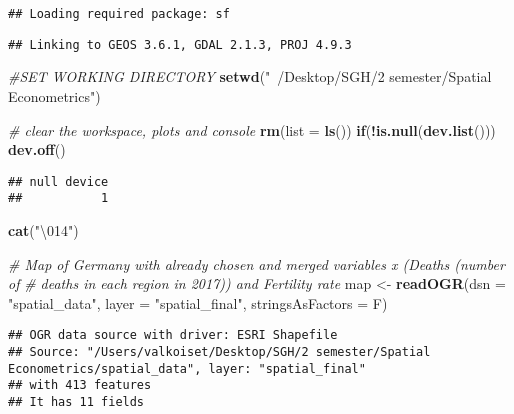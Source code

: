 \documentclass[]{article}
\newenvironment{Shaded}{\begin{snugshade}}{\end{snugshade}}
\newcommand{\KeywordTok}[1]{\textcolor[rgb]{0.13,0.29,0.53}{\textbf{#1}}}
\newcommand{\DataTypeTok}[1]{\textcolor[rgb]{0.13,0.29,0.53}{#1}}
\newcommand{\CharTok}[1]{\textcolor[rgb]{0.31,0.60,0.02}{#1}}
\newcommand{\StringTok}[1]{\textcolor[rgb]{0.31,0.60,0.02}{#1}}
\newcommand{\CommentTok}[1]{\textcolor[rgb]{0.56,0.35,0.01}{\textit{#1}}}
\newcommand{\ControlFlowTok}[1]{\textcolor[rgb]{0.13,0.29,0.53}{\textbf{#1}}}
\newcommand{\OperatorTok}[1]{\textcolor[rgb]{0.81,0.36,0.00}{\textbf{#1}}}
\newcommand{\NormalTok}[1]{#1}
\begin{document}
\begin{verbatim}
## Loading required package: sf
\end{verbatim}

\begin{verbatim}
## Linking to GEOS 3.6.1, GDAL 2.1.3, PROJ 4.9.3
\end{verbatim}

\begin{Shaded}
\begin{Highlighting}[]
\CommentTok{#SET WORKING DIRECTORY}
\KeywordTok{setwd}\NormalTok{(}\StringTok{"~/Desktop/SGH/2 semester/Spatial Econometrics"}\NormalTok{)}

\CommentTok{# clear the workspace, plots and console}
\KeywordTok{rm}\NormalTok{(}\DataTypeTok{list =} \KeywordTok{ls}\NormalTok{())}
\ControlFlowTok{if}\NormalTok{(}\OperatorTok{!}\KeywordTok{is.null}\NormalTok{(}\KeywordTok{dev.list}\NormalTok{())) }\KeywordTok{dev.off}\NormalTok{()}
\end{Highlighting}
\end{Shaded}

\begin{verbatim}
## null device 
##           1
\end{verbatim}

\begin{Shaded}
\begin{Highlighting}[]
\KeywordTok{cat}\NormalTok{(}\StringTok{"}\CharTok{\textbackslash{}014}\StringTok{"}\NormalTok{)}
\end{Highlighting}
\end{Shaded}



\begin{Shaded}
\begin{Highlighting}[]
\CommentTok{# Map of Germany with already chosen and merged variables x (Deaths (number of}
\CommentTok{# deaths in each region in 2017)) and Fertility rate}
\NormalTok{map <-}
\StringTok{  }\KeywordTok{readOGR}\NormalTok{(}\DataTypeTok{dsn =} \StringTok{"spatial_data"}\NormalTok{,}
          \DataTypeTok{layer =} \StringTok{"spatial_final"}\NormalTok{,}
          \DataTypeTok{stringsAsFactors =}\NormalTok{ F)}
\end{Highlighting}
\end{Shaded}

\begin{verbatim}
## OGR data source with driver: ESRI Shapefile 
## Source: "/Users/valkoiset/Desktop/SGH/2 semester/Spatial Econometrics/spatial_data", layer: "spatial_final"
## with 413 features
## It has 11 fields
\end{verbatim}
\end{document}
